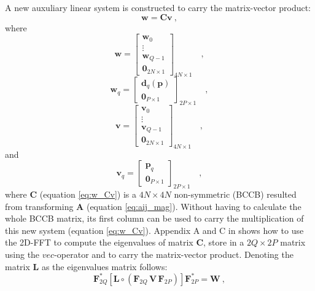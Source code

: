 A new auxuliary linear system is constructed to carry the matrix-vector product:
\begin{equation}
\mathbf{w} = \mathbf{C} \mathbf{v} \: ,
\label{eq:w_Cv}
\end{equation}
where
\begin{equation}
\mathbf{w} = \begin{bmatrix}
\mathbf{w}_{0} \\
\vdots \\
\mathbf{w}_{Q - 1} \\
\mathbf{0}_{2N \times 1}
\end{bmatrix}_{4N \times 1} \quad ,
\label{eq:w-vector}
\end{equation}
\begin{equation}
\mathbf{w}_{q} = \begin{bmatrix}
\mathbf{d}_{q}(\mathbf{p}) \\
\mathbf{0}_{P \times 1}
\end{bmatrix}_{2P \times 1}
\label{eq:wq-vector} \quad ,
\end{equation}
\begin{equation}
\mathbf{v} = \begin{bmatrix}
\mathbf{v}_{0} \\
\vdots \\
\mathbf{v}_{Q - 1} \\
\mathbf{0}_{2N \times 1}
\end{bmatrix}_{4N \times 1} \quad ,
\label{eq:v-vector}
\end{equation}
and
\begin{equation}
\mathbf{v}_{q} = \begin{bmatrix}
\mathbf{p}_{q} \\
\mathbf{0}_{P \times 1}
\end{bmatrix}_{2P \times 1}
\label{eq:vq-vector} \quad ,
\end{equation}
where $\mathbf{C}$ (equation \ref{eq:w_Cv}) is a $4N \times 4N$ non-symmetric (BCCB) resulted from transforming $\mathbf{A}$ (equation \ref{eq:aij_mag}). Without having to calculate the whole BCCB matrix, its first column can be used to carry the multiplication of this new system (equation \ref{eq:w_Cv}). Appendix A and C in \cite{takahashi2020convolutional} shows how to use the 2D-FFT to compute the eigenvalues of matrix $\mathbf{C}$, store in a $2Q \times 2P$ matrix using the $vec$-operator and to carry the matrix-vector product. Denoting the matrix $\mathbf{L}$ as the eigenvalues matrix follows:
\begin{equation}
	\mathbf{F}_{2Q}^{\ast} \left[ 
	\mathbf{L} \circ \left(\mathbf{F}_{2Q} \, \mathbf{V} \, \mathbf{F}_{2P} \right) 
	\right] \mathbf{F}_{2P}^{\ast} = \mathbf{W} \: ,
	\label{eq:DFT-system}
\end{equation}

